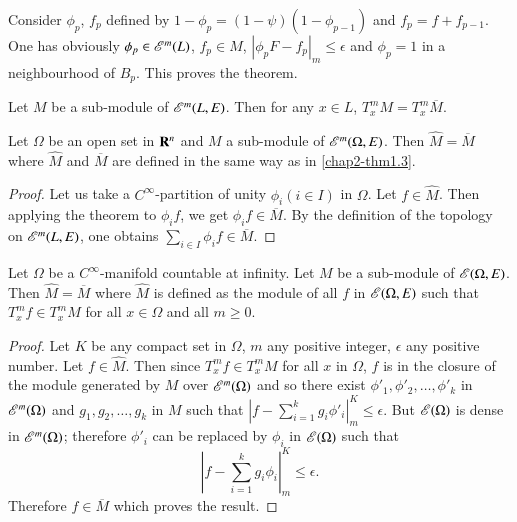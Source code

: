 Consider $\phi_{p}$, $f_{p}$ defined by $1-\phi_{p}=(1-\psi)(1-\phi_{p-1})$ and $f_{p}=f+f_{p-1}$. One has obviously $\phi_{p}\in \mathscr{E}^{m}(L)$, $f_{p}\in M$, $|\phi_{p}F-f_{p}|_{m}\leq \epsilon$ and $\phi_{p}=1$ in a neighbourhood of $B_{p}$. This proves the theorem.

\begin{corollary}\label{chap2-coro1.5}
Let $M$ be a sub-module of $\mathscr{E}^{m}(L,E)$. Then for any $x\in L$, $T^{m}_{x}M=T^{m}_{x}\overline{M}$.
\end{corollary}

\begin{corollary}\label{chap2-coro1.6}
Let $\Omega$ be an open set in $\mathbf{R}^{n}$ and $M$ a sub-module of $\mathscr{E}^{m}(\Omega,E)$. Then $\widehat{M}=\overline{M}$ where $\widehat{M}$ and $\overline{M}$ are defined in the same way as in \ref{chap2-thm1.3}.
\end{corollary}

\begin{proof}
Let us take a $C^{\infty}$-partition of unity $\phi_{i}(i\in I)$ in $\Omega$. Let $f\in \widehat{M}$. Then applying the theorem to $\phi_{i}f$, we get $\phi_{i}f\in \overline{M}$. By the definition of the topology on $\mathscr{E}^{m}(L,E)$, one obtains $\sum\limits_{i\in I}\phi_{i}f\in \overline{M}$.
\end{proof}

\begin{corollary}\label{chap2-coro1.7}
Let $\Omega$ be a $C^{\infty}$-manifold countable at infinity. Let $M$ be a sub-module of $\mathscr{E}(\Omega,E)$. Then $\widehat{M}=\overline{M}$ where $\widehat{M}$ is defined as the module of all $f$ in $\mathscr{E}(\Omega,E)$ such that $T^{m}_{x}f\in T^{m}_{x}M$ for all $x\in \Omega$ and all $m\geq 0$.
\end{corollary}

\begin{proof}
Let $K$ be any compact set in $\Omega$, $m$ any positive integer, $\epsilon$ any positive number. Let $f\in \widehat{M}$. Then since $T^{m}_{x}f\in T^{m}_{x}M$ for all $x$ in $\Omega$, $f$ is in the closure of the module generated by $M$ over $\mathscr{E}^{m}(\Omega)$ and so there exist $\phi'_{1},\phi'_{2},\ldots,\phi'_{k}$ in $\mathscr{E}^{m}(\Omega)$ and $g_{1},g_{2},\ldots,g_{k}$ in $M$ such that $\left|f-\sum\limits^{k}_{i=1}g_{i}\phi'_{i}\right|^{K}_{m}\leq \epsilon$. But $\mathscr{E}(\Omega)$ is dense in $\mathscr{E}^{m}(\Omega)$; therefore $\phi'_{i}$ can be replaced by $\phi_{i}$ in $\mathscr{E}(\Omega)$ such that
$$
\left|f-\sum\limits^{k}_{i=1}g_{i}\phi_{i}\right|^{K}_{m}\leq \epsilon.
$$
Therefore $f\in \overline{M}$ which proves the result.
\end{proof}

